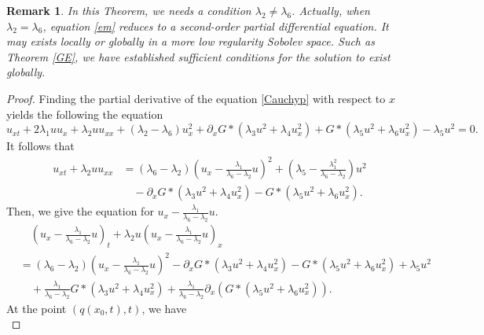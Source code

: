 \documentclass[11pt]{article}
\newtheorem{remark}{Remark}
\begin{document}
\begin{remark}
In this Theorem, we needs a condition $\lambda_{2}\neq\lambda_6$. Actually, when $\lambda_2=\lambda_6$, equation \eqref{em} reduces to a second-order partial differential equation. It may exists locally or globally in a more low regularity Sobolev space. Such as Theorem \ref{GE}, we have established sufficient conditions for the solution to exist globally.
\end{remark}

\begin{proof}
Finding the partial derivative of the equation \eqref{Cauchyp} with respect to $x$ yields the following the equation
\begin{equation*}\label{u_x}
u_{xt} + 2\lambda_1 uu_x + \lambda_2 u u_{xx} +(\lambda_2-\lambda_6) u_x^2 +\partial_xG\ast(\lambda_3 u^2 + \lambda_4 u_x^2) +  G \ast (\lambda_5 u^2 + \lambda_6 u_x^2) -\lambda_5 u^2 = 0.
\end{equation*}
It follows that 
\begin{equation*}\label{u_x1}
 \begin{aligned}
\quad u_{xt} + \lambda_2 u u_{xx}
&= (\lambda_6-\lambda_2) \left(u_x -\frac{\lambda_1}{\lambda_6-\lambda_2}u\right)^2 
+\left(\lambda_5-\frac{\lambda_1^2}{\lambda_6-\lambda_2}\right) u^2\\
&\quad-\partial_xG\ast(\lambda_3 u^2 + \lambda_4 u_x^2) -   G \ast (\lambda_5 u^2 + \lambda_6 u_x^2).
 \end{aligned}
\end{equation*}
Then, we give the equation for $u_x -\frac{\lambda_1}{\lambda_6-\lambda_2}u$.
\begin{equation*}\label{u_x-u}
\begin{aligned}
&\quad\left(u_x -\frac{\lambda_1}{\lambda_6-\lambda_2}u\right)_t 
+ \lambda_2 u \left(u_x -\frac{\lambda_1}{\lambda_6-\lambda_2}u\right)_{x}\\
&= (\lambda_6-\lambda_2) \left(u_x -\frac{\lambda_1}{\lambda_6-\lambda_2}u\right)^2 
-\partial_xG\ast(\lambda_3 u^2 + \lambda_4 u_x^2) -   G \ast (\lambda_5 u^2 + \lambda_6 u_x^2)
+\lambda_5 u^2 \\
&\quad+\frac{\lambda_1}{\lambda_6-\lambda_2}G\ast(\lambda_3 u^2 +\lambda_4 u_x^2) + \frac{\lambda_1}{\lambda_6-\lambda_2}\partial_x \left(  G \ast (\lambda_5 u^2 + \lambda_6 u_x^2) \right) .
\end{aligned}
\end{equation*}
At the point $(q(x_0,t),t)$, we have 
\begin{equation*}\label{u_x-u}

\end{equation*}
\end{proof}
\end{document}
